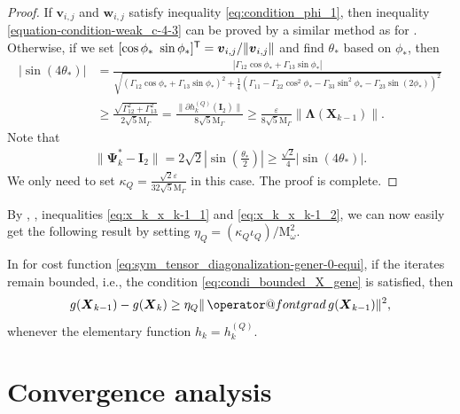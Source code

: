 \documentclass[final,onefignum,onetabnum]{siamart190516}
\makeatletter
\newcommand{\matr}[1]{\boldsymbol{#1}}
\newcommand{\vect}[1]{\boldsymbol{#1}}
\newcommand{\T}{{\sf T}} %
\newcommand{\ProjGrad}[2]{\mathop{{\operator@font grad} }#1(#2)}
\newcommand{\Utwo}{\Psi}
\makeatother
\begin{document}
\begin{proof}
If $\vect{v}_{i,j}$ and $\vect{w}_{i,j}$ satisfy  inequality \cref{eq:condition_phi_1}, then  inequality \cref{equation-condition-weak_c-4-3} can be proved by a similar method as for \cite[Lemma 7.2]{ULC2019}.
Otherwise, if we set $[\cos\phi_*\ \sin\phi_*]^\T=\vect{v}_{i,j}/{\|\vect{v}_{i,j}\|}$ and find $\theta_*$ based on $\phi_*$, then 
\begin{align*}
|\sin(4\theta_{*})|&=\frac{\left|\Gamma_{12}\cos\phi_*+\Gamma_{13}\sin\phi_*\right|}{\sqrt{\left(\Gamma_{12}\cos\phi_*+\Gamma_{13}\sin\phi_*\right)^2+\frac{1}{4}\left(\Gamma_{11}-\Gamma_{22}\cos^2\phi_*-\Gamma_{33}\sin^2\phi_*-\Gamma_{23}\sin(2\phi_*)\right)^2}}\\
&\geq \frac{\sqrt{\Gamma_{12}^2+\Gamma_{13}^2}}{2\sqrt{5}\mathrm{M}_{\Gamma}}
=\frac{\|\partial h^{(Q)}_k(\matr{I}_2)\|}{8\sqrt{5}\mathrm{M}_{\Gamma}}
\geq \frac{\varepsilon}{8\sqrt{5}\mathrm{M}_{\Gamma}}\|\matr{\Lambda}(\matr{X}_{k-1})\|. 
\end{align*}
Note that 
\begin{align*}
\|\matr{\Utwo}^{*}_{k}-\matr{I}_{2}\| = 2\sqrt{2}\left|\sin(\frac{\theta_{*}}{2})\right| \geq \frac{\sqrt{2}}{4}|\sin(4\theta_{*})|.
\end{align*}
We only need to set $\kappa_{Q}=\frac{\sqrt{2}\varepsilon}{32\sqrt{5}\mathrm{M}_{\Gamma}}$ in this case.
The proof is complete. 
\end{proof}


By , , inequalities \cref{eq:x_k_x_k-1_1} and \cref{eq:x_k_x_k-1_2}, we can now easily get the following result by setting $\eta_{Q}=(\kappa_{Q}\iota_{Q})/\mathrm{M}_{\omega}^2$. 

\begin{corollary}\label{lemma:weak_rho_inequality_c-4}
In  for cost function \cref{eq:sym_tensor_diagonalization-gener-0-equi},
if the iterates remain bounded, i.e., the condition \cref{eq:condi_bounded_X_gene} is satisfied, then 
\begin{equation*}
g(\matr{X}_{k-1})-g(\matr{X}_{k})\geq\eta_{Q}\|\ProjGrad{g}{\matr{X}_{k-1}}\|^2,
\end{equation*}
whenever the elementary function $h_k=h^{(Q)}_{k}$. 
\end{corollary}


\section{Convergence analysis}\label{sec:BCD-G}
\end{document}
